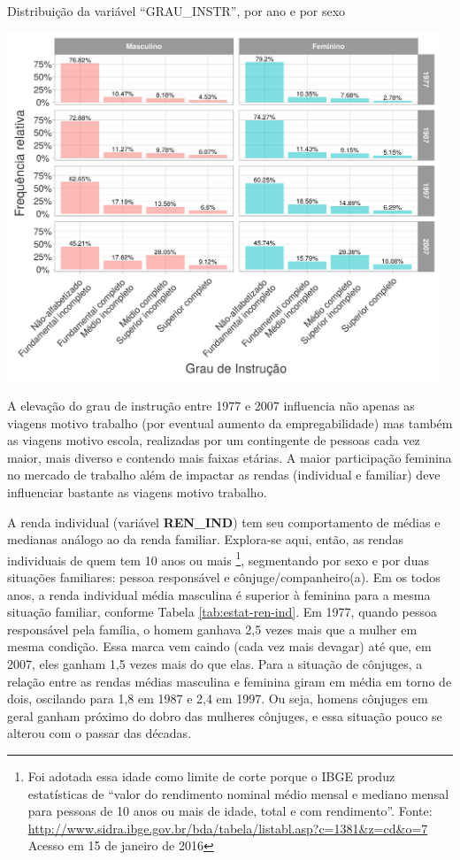 \begin{grafico}[htb]%
    \caption{\label{graf:distr-grau-instr} Distribuição da variável ``GRAU_INSTR'', por ano e por sexo}%
    \begin{center}%
        \includegraphics[width=0.97\textwidth]{./imagens/grau-instr.png}%
    \end{center}%
\end{grafico}%

A elevação do grau de instrução entre 1977 e 2007 influencia não apenas as viagens motivo trabalho (por eventual aumento da empregabilidade) mas também as viagens motivo escola, realizadas por um contingente de pessoas cada vez maior, mais diverso e contendo mais faixas etárias.
A maior participação feminina no mercado de trabalho além de impactar as rendas (individual e familiar) deve influenciar bastante as viagens motivo trabalho. 

A renda individual (variável \textbf{REN_IND}) tem seu comportamento de médias e medianas análogo ao da renda familiar. Explora-se aqui, então, as rendas individuais de quem tem 10 anos ou mais%
\footnote{Foi adotada essa idade como limite de corte porque o IBGE produz estatísticas de ``valor do rendimento nominal médio mensal e mediano mensal para pessoas de 10 anos ou mais de idade, total e com rendimento''. Fonte: \url{http://www.sidra.ibge.gov.br/bda/tabela/listabl.asp?c=1381&z=cd&o=7} Acesso em 15 de janeiro de 2016}, 
segmentando por sexo e por duas situações familiares: pessoa responsável e cônjuge/companheiro(a).
Em os todos anos, a renda individual média masculina é superior à feminina para a mesma situação familiar, conforme Tabela \ref{tab:estat-ren-ind}. 
Em 1977, quando pessoa responsável pela família, o homem ganhava 2,5 vezes mais que a mulher em mesma condição. Essa marca vem caindo (cada vez mais devagar) até que, em 2007, eles ganham 1,5 vezes mais do que elas.
Para a situação de cônjuges, a relação entre as rendas médias masculina e feminina giram em média em torno de dois, oscilando para 1,8 em 1987 e 2,4 em 1997. Ou seja, homens cônjuges em geral ganham próximo do dobro das mulheres cônjuges, e essa situação pouco se alterou com o passar das décadas.

